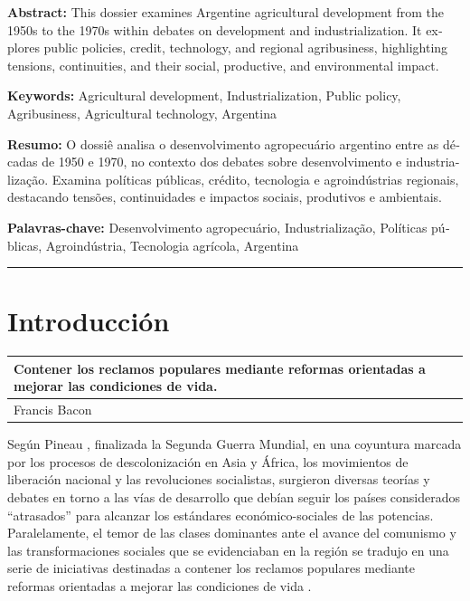 \documentclass{article}
\makeatletter
\newcommand{\epigraph}[2]{%
  \par\nobreak\noindent\par\nobreak\vspace{.5\baselineskip}%
  \hfill{%
    \small
    \begin{tabular}{@{}>{{\raggedright\arraybackslash}}m{.65\textwidth}@{}}%
      #1 \\[1ex]%
      \midrule%
      \hfill #2%
    \end{tabular}%
  }%
  \vspace{.5\baselineskip}%
}
\makeatother
\begin{document}
\begin{tcolorbox}[colback=brown!8!white,colframe=brown!8!white,boxrule=0pt,arc=2pt,left=4pt,right=4pt,top=3pt,bottom=3pt,before skip=4pt,after skip=4pt]
\begin{otherlanguage}{english}
\sffamily\small \textbf{Abstract:} This dossier examines Argentine agricultural development from the 1950s to the 1970s within debates on development and industrialization. It explores public policies, credit, technology, and regional agribusiness, highlighting tensions, continuities, and their social, productive, and environmental impact.
\par\smallskip\noindent\textbf{Keywords:} Agricultural development, Industrialization, Public policy, Agribusiness, Agricultural technology, Argentina
\end{otherlanguage}
\end{tcolorbox}

\begin{tcolorbox}[colback=brown!8!white,colframe=brown!8!white,boxrule=0pt,arc=2pt,left=4pt,right=4pt,top=3pt,bottom=3pt,before skip=4pt,after skip=4pt]
\begin{otherlanguage}{portuguese}
\sffamily\small \textbf{Resumo:} O dossiê analisa o desenvolvimento agropecuário argentino entre as décadas de 1950 e 1970, no contexto dos debates sobre desenvolvimento e industrialização. Examina políticas públicas, crédito, tecnologia e agroindústrias regionais, destacando tensões, continuidades e impactos sociais, produtivos e ambientais.
\par\smallskip\noindent\textbf{Palavras-chave:} Desenvolvimento agropecuário, Industrialização, Políticas públicas, Agroindústria, Tecnologia agrícola, Argentina
\end{otherlanguage}
\end{tcolorbox}

\bigskip
\noindent\rule{\linewidth}{0.4pt}
\bigskip

\section{Introducción}

\epigraph{Contener los reclamos populares mediante reformas orientadas a mejorar las condiciones de vida.

}{Francis Bacon}

Según Pineau \autocite*{3040-PINEAU2018}, finalizada la Segunda Guerra Mundial, en una coyuntura marcada por los procesos de descolonización en Asia y África, los movimientos de liberación nacional y las revoluciones socialistas, surgieron diversas teorías y debates en torno a las vías de desarrollo que debían seguir los países considerados “atrasados” para alcanzar los estándares económico-sociales de las potencias. Paralelamente, el temor de las clases dominantes ante el avance del comunismo y las transformaciones sociales que se evidenciaban en la región se tradujo en una serie de iniciativas destinadas a contener los reclamos populares mediante reformas orientadas a mejorar las condiciones de vida \autocite{3040-PINEAU2018}.
\end{document}
